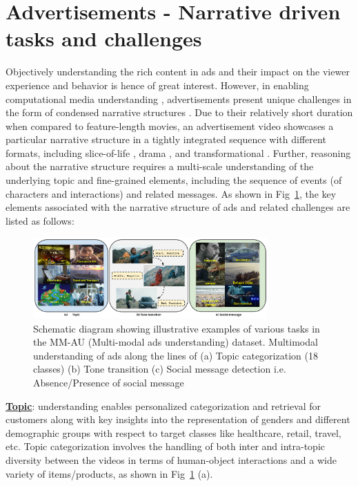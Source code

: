 \section{Advertisements - Narrative driven tasks and challenges}

Objectively understanding the rich content in ads and their impact on the viewer experience and behavior is hence of great interest. However, in enabling computational media understanding \cite{CMI}, advertisements present unique challenges in the form of condensed narrative structures \cite{Kim2017WhyNA}. Due to their relatively short duration when compared to feature-length movies, an advertisement video showcases a particular narrative structure in a tightly integrated sequence with different formats, including slice-of-life \cite{Mick1987TowardAS}, drama \cite{Leong1994UsingDT}, and transformational \cite{Puto1984InformationalAT}. Further, reasoning about the narrative structure requires a multi-scale understanding of the underlying topic and fine-grained elements, including the sequence of events  (of characters and interactions) and related messages. As shown in Fig~\ref{introfig}, the key elements associated with the narrative structure of ads and related challenges are listed as follows:

\begin{figure}[h!]
\centering 
    \includegraphics[width=0.8\textwidth]{figures/Task_outline_1_Topic_TT_SM.pdf}
  \caption{Schematic diagram showing illustrative examples of various tasks in the MM-AU (Multi-modal ads understanding) dataset. Multimodal understanding of ads along the lines of (a) Topic categorization (18 classes) (b) Tone transition (c) Social message detection i.e. Absence/Presence of social message}
  \label{introfig}
\end{figure}

\textbf{\underline{Topic}}: understanding enables personalized categorization and retrieval for customers along with key insights into the representation of genders \cite{google-diversity} and different demographic groups with respect to target classes like healthcare, retail, travel, etc. Topic categorization involves the handling of both inter and intra-topic diversity between the videos in terms of human-object interactions and a wide variety of items/products, as shown in Fig~\ref{introfig} (a). 

